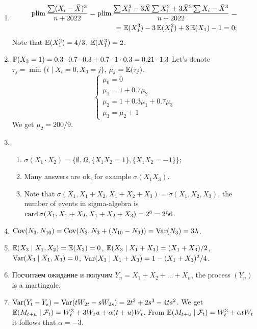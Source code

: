 \begin{enumerate}
    \item 
    \begin{align*}
        \plim \frac{\sum (X_i - \bar X)^3}{n+2022} = \plim \frac{\sum X_i^3 - 3\bar X\sum X_i^2 +3\bar X^2 \sum X_i - \bar X^3}{n+2022} = \\
        = \E(X_1^3) - 3\E(X_1^2) + 3\E(X_1) - 1 = 0;
    \end{align*}
    Note that $\E(X_1^2) = 4/3$, $\E(X_1^3) = 2$.
    \item $\P(X_3 = 1) = 0.3\cdot 0.7\cdot 0.3 + 0.7\cdot 1\cdot 0.3 = 0.21 \cdot 1.3$
    Let's denote $\tau_j = \min \{t \mid X_t = 0, X_0 = j\}$, $\mu_j = \E(\tau_j)$.
    \[
    \begin{cases}
        \mu_0 = 0 \\
        \mu_1 = 1 + 0.7\mu_2 \\
        \mu_2 = 1 + 0.3\mu_1 + 0.7\mu_3 \\
        \mu_3 = \mu_2 + 1 
    \end{cases}    
    \]
    We get $\mu_2 = 200/9$.
    \item \begin{enumerate}
        \item $\sigma(X_1 \cdot X_2) = \{\emptyset, \Omega, \{X_1 X_2 = 1\}, \{X_1 X_2 = -1\}\}$;
        \item Many answers are ok, for example $\sigma(X_1 X_3)$.
        \item Note that $\sigma(X_1, X_1 + X_2, X_1+ X_2+X_3) = \sigma(X_1, X_2, X_3)$, the number of events in sigma-algebra is
        $\card \sigma(X_1, X_1 + X_2, X_1+ X_2+X_3) = 2^8 = 256$.
    \end{enumerate}
    \item $\Cov(N_3, N_{10}) = \Cov(N_3, N_3 + (N_{10} - N_3)) = \Var(N_3) = 3\lambda$.
    \item $\E(X_3 \mid X_1, X_2) = \E(X_3) = 0$, $\E(X_3 \mid X_1 + X_3) = (X_1 + X_3) / 2$, $\Var(X_3 \mid X_1, X_3) = 0$,
    $\Var(X_3 \mid X_1 + X_3) = 1 - (X_1 + X_3)^2/4$.
    \item Посчитаем ожидание и получим $Y_n = X_1 + X_2 + \ldots + X_n$, the process $(Y_n)$ is a martingale.
    \item $\Var(Y_t - Y_s) = \Var(tW_{2t} - sW_{2s}) = 2t^3 + 2s^3 - 4ts^2$.
    We get $\E(M_{t+u} \mid \mathcal F_t ) = W_t^3 + 3W_t u  + \alpha(t + u) W_t$.
    From $\E(M_{t+u} \mid \mathcal F_t ) = W_t^3 + \alpha t W_t$ it follows that $\alpha = -3$.
\end{enumerate}


